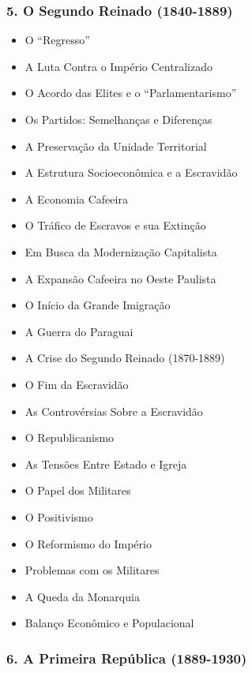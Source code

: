 \documentclass[a4paper,12pt]{article}[abntex2]
\begin{document}
\subsubsection*{5. O Segundo Reinado (1840-1889)}

\begin{itemize}
\item O “Regresso”
\item A Luta Contra o Império Centralizado
\item O Acordo das Elites e o “Parlamentarismo”
\item Os Partidos: Semelhanças e Diferenças
\item A Preservação da Unidade Territorial
\item A Estrutura Socioeconômica e a Escravidão
\item A Economia Cafeeira
\item O Tráfico de Escravos e sua Extinção
\item Em Busca da Modernização Capitalista
\item A Expansão Cafeeira no Oeste Paulista
\item O Início da Grande Imigração
\item A Guerra do Paraguai
\item A Crise do Segundo Reinado (1870-1889)
\item O Fim da Escravidão
\item As Controvérsias Sobre a Escravidão
\item O Republicanismo
\item As Tensões Entre Estado e Igreja
\item O Papel dos Militares
\item O Positivismo
\item O Reformismo do Império
\item Problemas com os Militares
\item A Queda da Monarquia
\item Balanço Econômico e Populacional
\end{itemize}
\subsubsection*{6. A Primeira República (1889-1930)}
\end{document}
